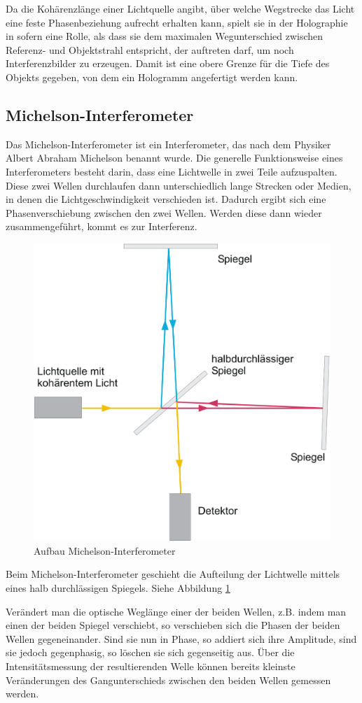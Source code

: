 \documentclass[12pt]{article}
\begin{document}
Da die Kohärenzlänge einer Lichtquelle angibt, über welche Wegstrecke das Licht eine feste
Phasenbeziehung aufrecht erhalten kann, spielt sie in der Holographie in sofern eine Rolle, als
dass sie dem maximalen Wegunterschied zwischen Referenz- und Objektstrahl entspricht, der
auftreten darf, um noch Interferenzbilder zu erzeugen. Damit ist eine obere Grenze für die Tiefe
des Objekts gegeben, von dem ein Hologramm angefertigt werden kann.

\subsection{Michelson-Interferometer}
Das Michelson-Interferometer ist ein Interferometer, das nach dem Physiker Albert Abraham Michelson benannt wurde. 
Die generelle Funktionsweise eines Interferometers besteht darin, dass eine Lichtwelle in zwei Teile aufzuspalten. Diese zwei Wellen durchlaufen dann
unterschiedlich lange Strecken oder Medien, in denen die Lichtgeschwindigkeit verschieden ist. Dadurch ergibt sich eine Phasenverschiebung zwischen den
zwei Wellen. Werden diese dann wieder zusammengeführt, kommt es zur Interferenz.
\begin{figure}[h]
 \centering
 \includegraphics[width=0.5\linewidth]{pictures/michelson.eps}
 \caption{Aufbau Michelson-Interferometer}
 \label{michelson}
\end{figure}
Beim Michelson-Interferometer geschieht die Aufteilung der Lichtwelle mittels eines halb durchlässigen Spiegels. Siehe Abbildung \ref{michelson}

Verändert man die optische Weglänge einer der beiden Wellen, z.B. indem man einen der beiden Spiegel verschiebt, so verschieben sich die Phasen der beiden
Wellen gegeneinander. Sind sie nun in Phase, so addiert sich ihre Amplitude, sind sie jedoch gegenphasig, so
löschen sie sich gegenseitig aus. Über die Intensitätsmessung der resultierenden Welle können bereits kleinste Veränderungen des
Gangunterschieds zwischen den beiden Wellen gemessen werden.
\end{document}
